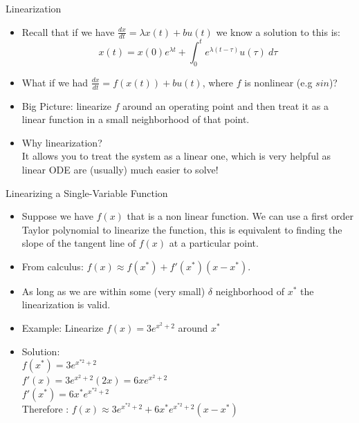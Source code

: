 \documentclass{beamer}
\begin{document}
	\begin{frame}{Linearization}
	\begin{itemize}


	    \item Recall that if we have $\frac{dx}{dt} = \lambda x(t) + bu(t)$ we know a solution to this is: $$x(t) = x(0)e^{\lambda t} + \int_0^t \! e^{\lambda(t - \tau)}u(\tau)\ d\tau$$
	    \item What if we had $\frac{dx}{dt} = f(x(t)) + bu(t)$, where $f$ is nonlinear (e.g $sin$)? \pause \\
	    \item Big Picture: linearize $f$ around an operating point and then treat it as a linear function in a small neighborhood of that point.\\
	    \item Why linearization? \pause
	    \\ It allows you to treat the system as a linear one, which is very helpful as linear ODE are (usually) much easier to solve!
	\end{itemize}
	\end{frame}
	\begin{frame}{Linearizing a Single-Variable Function}
	  \begin{itemize}
	      \item Suppose we have $f(x)$ that is a non linear function. We can use a first order Taylor polynomial to linearize the function, this is equivalent to finding the slope of the tangent line of $f(x)$ at a particular point.
	      \item From calculus: $f(x) \approx f(x^*) + f'(x^*)(x - x^*)$.
	      \item As long as we are within some (very small) $\delta$ neighborhood of $x^*$ the linearization is valid.
	      \item Example: Linearize $f(x) = 3e^{x^2 + 2}$ around $x^*$ 
	      \item Solution: \\
	      $f(x^*) = 3e^{x^{*2} + 2}$\\
	      $f'(x) = 3e^{x^2+2}(2x) = 6xe^{x^2+2}$\\
	      $f'(x^*) = 6x^*e^{x^{*2}+2}$\\
	      Therefore :
	      $f(x) \approx 3e^{x^{*2} + 2} +  6x^*e^{x^{*2}+2}(x-x^*) $
	  \end{itemize}
	  
	\end{frame}
\end{document}
